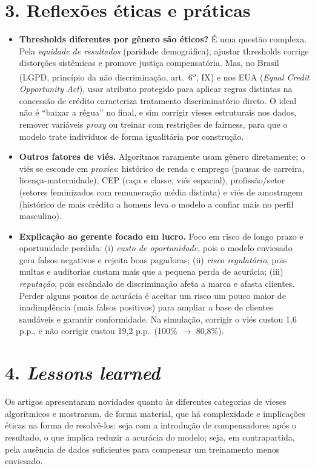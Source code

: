 \documentclass[10pt,a4paper]{article}
\begin{document}
\section*{3. Reflex\~oes \'eticas e pr\'aticas}
\begin{itemize}
  \item \textbf{Thresholds diferentes por g\^enero s\~ao \'eticos?} \'E uma quest\~ao complexa. Pela \textit{equidade de resultados} (paridade demogr\'afica), ajustar thresholds corrige distor\c{c}\~oes sist\^emicas e promove justi\c{c}a compensat\'oria. Mas, no Brasil (LGPD, princ\'ipio da n\~ao discrimina\c{c}\~ao, art.~6\textsuperscript{o}, IX) e nos EUA (\textit{Equal Credit Opportunity Act}), usar atributo protegido para aplicar regras distintas na concess\~ao de cr\'edito caracteriza tratamento discriminat\'orio direto. O ideal n\~ao \'e ``baixar a r\'egua'' no final, e sim corrigir vieses estruturais nos dados, remover vari\'aveis \textit{proxy} ou treinar com restri\c{c}\~oes de fairness, para que o modelo trate indiv\'iduos de forma igualit\'aria por constru\c{c}\~ao.
  \item \textbf{Outros fatores de vi\'es.} Algoritmos raramente usam g\^enero diretamente; o vi\'es se esconde em \textit{proxies}: hist\'orico de renda e emprego (pausas de carreira, licen\c{c}a-maternidade), CEP (ra\c{c}a e classe, vi\'es espacial), profiss\~ao/setor (setores feminizados com remunera\c{c}\~ao m\'edia distinta) e vi\'es de amostragem (hist\'orico de mais cr\'edito a homens leva o modelo a confiar mais no perfil masculino).
  \item \textbf{Explica\c{c}\~ao ao gerente focado em lucro.} Foco em risco de longo prazo e oportunidade perdida: (i) \textit{custo de oportunidade}, pois o modelo enviesado gera falsos negativos e rejeita boas pagadoras; (ii) \textit{risco regulat\'orio}, pois multas e auditorias custam mais que a pequena perda de acur\'acia; (iii) \textit{reputa\c{c}\~ao}, pois esc\^andalo de discrimina\c{c}\~ao afeta a marca e afasta clientes. Perder alguns pontos de acur\'acia \'e aceitar um risco um pouco maior de inadimpl\^encia (mais falsos positivos) para ampliar a base de clientes saud\'aveis e garantir conformidade. Na simula\c{c}\~ao, corrigir o vi\'es custou 1,6 p.p., e n\~ao corrigir custou 19,2 p.p.\ (100\% $\to$ 80,8\%).
\end{itemize}

\section*{4. \textit{Lessons learned}}
Os artigos apresentaram novidades quanto \`as diferentes categorias de vieses algor\'itmicos e mostraram, de forma material, que h\'a complexidade e implica\c{c}\~oes \'eticas na forma de resolv\^e-los: seja com a introdu\c{c}\~ao de compensadores ap\'os o resultado, o que implica reduzir a acur\'acia do modelo; seja, em contrapartida, pela aus\^encia de dados suficientes para compensar um treinamento menos enviesado.
\end{document}
